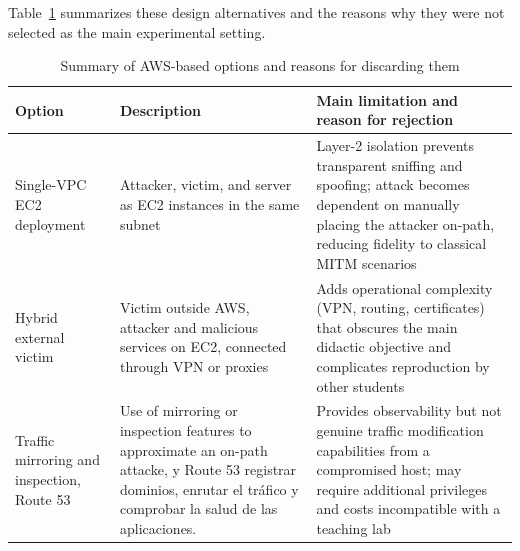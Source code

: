 \documentclass[conference]{IEEEtran}
\begin{document}
Table~\ref{tab:options_comparison} summarizes these design alternatives and the reasons why they were not selected as the main experimental setting.

\begin{table}[H]
\caption{Summary of AWS-based options and reasons for discarding them}
\label{tab:options_comparison}
\begin{center}
\begin{tabular}{@{}p{1cm} p{3.3cm} p{3.8cm}@{}} \hline
\textbf{Option} & \textbf{Description} & \textbf{Main limitation and reason for rejection} \\ \hline
Single-VPC EC2 deployment & Attacker, victim, and server as EC2 instances in the same subnet & Layer-2 isolation prevents transparent sniffing and spoofing; attack becomes dependent on manually placing the attacker on-path, reducing fidelity to classical MITM scenarios \\
Hybrid external victim & Victim outside AWS, attacker and malicious services on EC2, connected through VPN or proxies & Adds operational complexity (VPN, routing, certificates) that obscures the main didactic objective and complicates reproduction by other students \\
Traffic mirroring and inspection, Route 53 & Use of mirroring or inspection features to approximate an on-path attacke,  y Route 53 registrar dominios, enrutar el tráfico y comprobar la salud de las aplicaciones. & Provides observability but not genuine traffic modification capabilities from a compromised host; may require additional privileges and costs incompatible with a teaching lab \\ \hline
\end{tabular}
\end{center}
\end{table}
\end{document}

